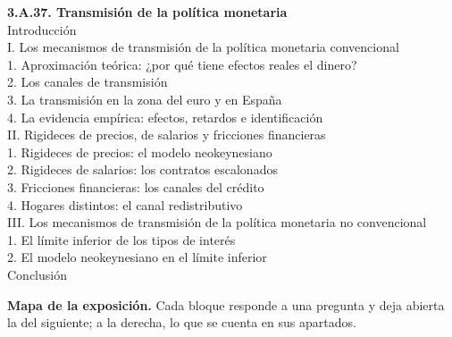 \documentclass[11pt]{article}
\begin{document}
\begin{esquema}[unbreakable]
\textbf{3.A.37. Transmisión de la política monetaria}\\[2pt]
Introducción\\
I. Los mecanismos de transmisión de la política monetaria convencional\\
\hspace*{1.5em}1. Aproximación teórica: ¿por qué tiene efectos reales el dinero?\\
\hspace*{1.5em}2. Los canales de transmisión\\
\hspace*{1.5em}3. La transmisión en la zona del euro y en España\\
\hspace*{1.5em}4. La evidencia empírica: efectos, retardos e identificación\\
II. Rigideces de precios, de salarios y fricciones financieras\\
\hspace*{1.5em}1. Rigideces de precios: el modelo neokeynesiano\\
\hspace*{1.5em}2. Rigideces de salarios: los contratos escalonados\\
\hspace*{1.5em}3. Fricciones financieras: los canales del crédito\\
\hspace*{1.5em}4. Hogares distintos: el canal redistributivo\\
III. Los mecanismos de transmisión de la política monetaria no convencional\\
\hspace*{1.5em}1. El límite inferior de los tipos de interés\\
\hspace*{1.5em}2. El modelo neokeynesiano en el límite inferior\\
Conclusión
\end{esquema}

\begin{anotaciones}
\textbf{Mapa de la exposición.} Cada bloque responde a una pregunta y deja abierta la del siguiente; a la derecha, lo que se cuenta en sus apartados.
\begin{infografiacaja}
\caption{Mapa de la exposición: la pregunta de cada bloque y el hilo que los une}\label{figu:mapa-tema}
\end{infografiacaja}
\end{anotaciones}
\end{document}
